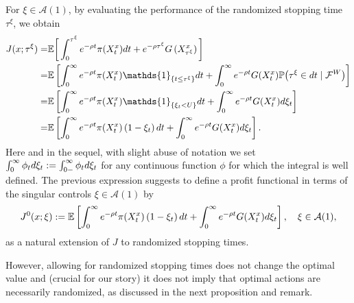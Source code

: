 \documentclass[11pt]{amsart}
\theoremstyle{plain}
\def \dd{{\rm d}}
\def \cF{{\mathcal F}}
\numberwithin{equation}{section}
\begin{document}
For $\xi \in \mathcal A (1)$, by evaluating the performance of the randomized stopping time $\tau^\xi$, we obtain
\begin{align*}
J(x;\tau^\xi)  =& 
\mathbb{E}\bigg[ \int_{0}^{\tau^\xi} e^{- \rho t} \pi (X^x_{t}) \dd t +e ^{- \rho \tau^\xi} G\left(X^x_{\tau^\xi}\right)\bigg] \\
 =& \mathbb{E}\left[\int_{0}^{\infty} e^{- \rho t} \pi (X^x_{t}) \mathds{1}_{\{t \leq \tau^\xi \}} \dd t 
 +\int_{0}^{\infty} e ^{- \rho t} G(X^x_t ) \mathbb{P} \big( \tau^\xi \in \dd t \mid \cF^{W}\big) \right] \\
 =& \mathbb{E}\left[\int_{0}^{\infty} e^{-\rho t} \pi (X^x_{t})  \mathds{1}_{\left\{\xi_{t}< U\right\}} \dd t +  \int_{0}^{\infty} e ^{- \rho t} G(X^x_t ) \dd \xi_t \right] \\
 =& \mathbb{E}\left[\int_{0}^{\infty} e^{-\rho t} \pi (X^x_{t}) \left(1-\xi_{t}\right) \dd t + \int_{0}^{\infty} e ^{- \rho t} G(X^x_t ) \dd \xi_t  \right].
\end{align*}
{Here and in the sequel, with slight abuse of notation we set $\int_0^\infty \phi_t \dd \xi_t : = \int_{0-}^\infty \phi_t \dd \xi_t$ for any continuous function $\phi$ for which the integral is well defined.}
The previous expression suggests to define a profit functional in terms of the singular controls $\xi \in \mathcal A (1)$ by
\begin{equation*}
    J^0 (x;\xi)  := \mathbb{E}\left[\int_{0}^{\infty} e^{-\rho t} \pi (X^x_{t}) \left(1-\xi_{t}\right) \dd t + \int_{0}^{\infty} e ^{- \rho t} G(X^x_t ) \dd \xi_t  \right], \quad \xi \in \mathcal A (1),
\end{equation*}
as a natural extension of $J$ to randomized stopping times.

However, allowing for randomized stopping times does not change the optimal value and (crucial for our story) it  does not imply that optimal actions are necessarily randomized, as discussed in the next proposition and remark.
\end{document}
